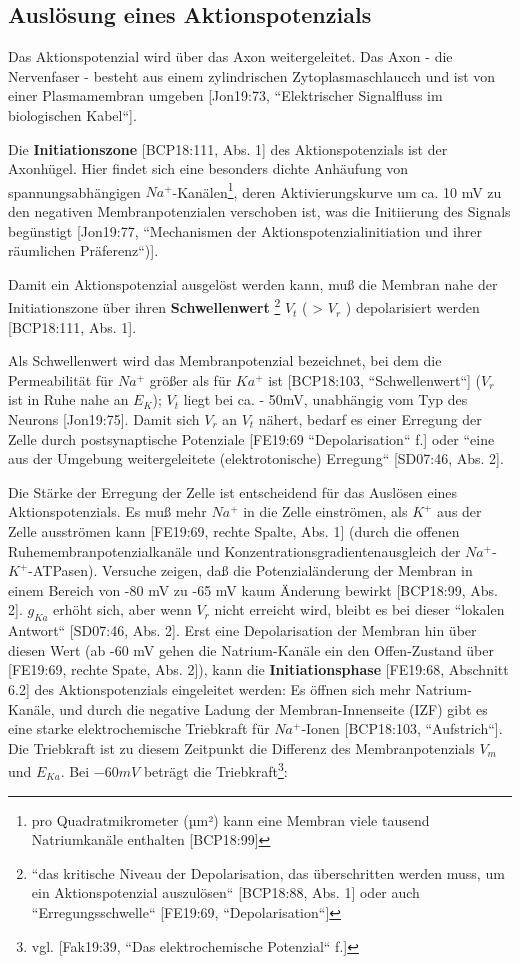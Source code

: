 {{\subsection{Auslösung eines Aktionspotenzials}

Das Aktionspotenzial wird über das Axon weitergeleitet. Das Axon - die Nervenfaser - besteht aus einem zylindrischen Zytoplasmaschlaucch und ist von einer Plasmamembran umgeben [Jon19:73, ``Elektrischer Signalfluss im biologischen Kabel``].

Die \textbf{Initiationszone} [BCP18:111, Abs. 1] des Aktionspotenzials ist der Axonhügel. Hier findet sich eine besonders dichte Anhäufung von spannungsabhängigen $Na^+$-Kanälen\footnote{
 pro Quadratmikrometer (µm²) kann eine Membran viele tausend Natriumkanäle enthalten {[BCP18:99]}
}, deren Aktivierungskurve um ca. 10 mV zu den negativen Membranpotenzialen verschoben ist, was die Initiierung des Signals begünstigt [Jon19:77, ``Mechanismen der Aktionspotenzialinitiation und ihrer räumlichen Präferenz``)].

Damit ein Aktionspotenzial ausgelöst werden kann, muß die Membran nahe der Initiationszone über ihren \textbf{Schwellenwert} \footnote{
 ``das kritische Niveau der Depolarisation, das überschritten werden muss, um ein Aktionspotenzial auszulösen`` {[BCP18:88, Abs. 1]} oder auch ``Erregungsschwelle`` {[FE19:69, ``Depolarisation``]}
} $V_t$ ( > $V_r$ ) depolarisiert werden [BCP18:111, Abs. 1].


 Als Schwellenwert wird das Membranpotenzial bezeichnet, bei dem die Permeabilität für $Na^+$ größer als für $Ka^+$ ist [BCP18:103, ``Schwellenwert``] ($V_r$ ist in Ruhe nahe an $E_K$); $V_t$ liegt bei ca. - 50mV, unabhängig vom Typ des Neurons [Jon19:75].
 Damit sich $V_r$ an $V_t$ nähert, bedarf es einer Erregung der Zelle durch postsynaptische Potenziale [FE19:69 ``Depolarisation`` f.] oder ``eine aus der Umgebung weitergeleitete (elektrotonische) Erregung`` [SD07:46, Abs. 2].

Die Stärke der Erregung der Zelle ist entscheidend für das Auslösen eines Aktionspotenzials. Es muß mehr $Na^+$ in die Zelle einströmen, als $K^+$ aus der Zelle ausströmen kann [FE19:69, rechte Spalte, Abs. 1] (durch die offenen Ruhemembranpotenzialkanäle und Konzentrationsgradientenausgleich der $Na^+$-$K^+$-ATPasen).
Versuche zeigen, daß die Potenzialänderung der Membran in einem Bereich von -80 mV zu -65 mV kaum Änderung bewirkt [BCP18:99, Abs. 2]. $g_{Ka}$ erhöht sich, aber wenn $V_r$ nicht erreicht wird, bleibt es bei dieser ``lokalen Antwort`` [SD07:46, Abs. 2]. Erst eine Depolarisation der Membran hin über diesen Wert (ab -60 mV gehen die Natrium-Kanäle ein den Offen-Zustand über [FE19:69, rechte Spate, Abs. 2]), kann die \textbf{Initiationsphase} [FE19:68, Abschnitt 6.2] des Aktionspotenzials eingeleitet werden: Es öffnen sich mehr Natrium-Kanäle, und durch die negative Ladung der Membran-Innenseite (IZF) gibt es eine starke elektrochemische Triebkraft für $Na^+$-Ionen [BCP18:103, ``Aufstrich``]. Die Triebkraft ist zu diesem Zeitpunkt die Differenz des Membranpotenzials $V_m$ und $E_{Ka}$. Bei $-60 mV$ beträgt die Triebkraft\footnote{
 vgl. {[Fak19:39, ``Das elektrochemische Potenzial`` f.]}
}:

}}
